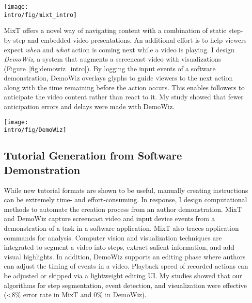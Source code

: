 \begin{figure*}[t]
  \centering
  \texttt{[image: \\intro/fig/mixt\_intro]}
  \caption{MixT generates step-by-step tutorials (left) that contain static and video information from task demonstrations. Videos are automatically edited and offer different views (right) to highlight the most relevant screen areas for a step. Visualizing mouse movement helps user understand a complex action.}
  \label{fig:mixt_intro}
\end{figure*}


MixT offers a novel way of navigating content with a combination of static step-by-step and embedded video presentations. An additional effort is to help viewers expect \emph{when} and \emph{what} action is coming next while a video is playing. I design \emph{DemoWiz}, a system that augments a screencast video with visualizations (Figure~\ref{fig:demowiz_intro}). By logging the input events of a software demonstration, DemoWiz overlays glyphs to guide viewers to the next action along with the time remaining before the action occurs. This enables followers to anticipate the video content rather than react to it.
%
My study showed that fewer anticipation errors and delays were made with DemoWiz.

\begin{figure*}[t]
\centering
\texttt{[image: \\intro/fig/DemoWiz]}
\caption{DemoWiz visualizes input events in a screencast video to help viewers anticipate the upcoming event for narrating a software demonstration in a live presentation.}
\label{fig:demowiz_intro}
\end{figure*}

\subsection{Tutorial Generation from Software Demonstration}

While new tutorial formats are shown to be useful, manually creating instructions can be extremely time- and effort-consuming. In response, I design computational methods to automate the creation process from an author demonstration. MixT and DemoWiz capture screencast video and input device events from a demonstration of a task in a software application. MixT also traces application commands for analysis. Computer vision and visualization techniques are integrated to segment a video into steps, extract salient information, and add visual highlights.
%
In addition, DemoWiz supports an editing phase where authors can adjust the timing of events in a video. Playback speed of recorded actions can be adjusted or skipped via a lightweight editing UI. My studies showed that our algorithms for step segmentation, event detection, and visualization were effective (\textless8\% error rate in MixT and 0\% in DemoWiz).

